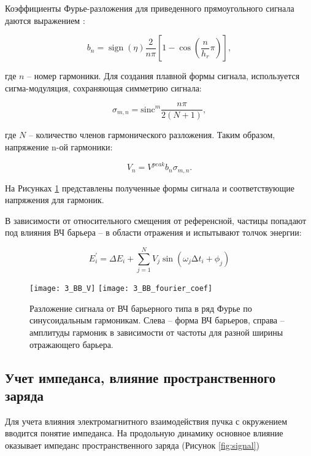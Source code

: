 Коэффициенты Фурье-разложения для приведенного прямоугольного сигнала даются выражением \cite{bbcern}:

\begin{equation}
b_n=\operatorname{sign}{\left(\eta\right)}\frac{2}{n\pi}\left[1-\cos{\left(\frac{n}{h_r}\pi\right)}\right],
\label{b}
\end{equation}

где $n$ – номер гармоники. Для создания плавной формы сигнала, используется сигма-модуляция, сохраняющая симметрию сигнала:

\begin{equation}
\sigma_{m, n}={\text{sinc}}^m{\frac{n\pi}{2\left(N+1\right)}},
\label{sigma}
\end{equation}

где $N$ – количество членов гармонического разложения. Таким образом, напряжение n-ой гармоники:

\begin{equation}
V_n=V^{peak}b_n\sigma_{m, n}.
\label{Volt_n}
\end{equation}

На Рисунках \ref{fig:wave} представлены полученные формы сигнала и со\-от\-вет\-ству\-ющ\-ие напряжения для гармоник.

В зависимости от относительного смещения от референсной, частицы попадают под влияния ВЧ барьера – в области отражения и испытывают толчок энергии:

\begin{equation}
E_i^\prime=\Delta E_i+\sum_{j=1}^{N} V_j\sin{\left(\omega_{j}\mathrm{\Delta}t_i+\phi_j\right)} 
\label{dE}
\end{equation}

\begin{figure}[!h]
   \texttt{[image: 3\_BB\_V]}
   \texttt{[image: 3\_BB\_fourier\_coef]}
   \caption{Разложение сигнала от ВЧ барьерного типа в ряд Фурье по синусоидальным гармоникам. Слева – форма 
   ВЧ барьеров, справа – амплитуды гармоник в зависимости от частоты для разной ширины отражающего барьера.}
   \label{fig:wave}
\end{figure}

\subsection{Учет импеданса, влияние пространственного заряда}\label{subsec:transition_jump/regular/SC}

\par Для учета влияния электромагнитного взаимодействия пучка с ок\-ру\-же\-ни\-ем вводится понятие импеданса. На продольную динамику основное влияние оказывает импеданс пространственного заряда \cite{laclare} (Рисунок \ref{fig:signal}) 

